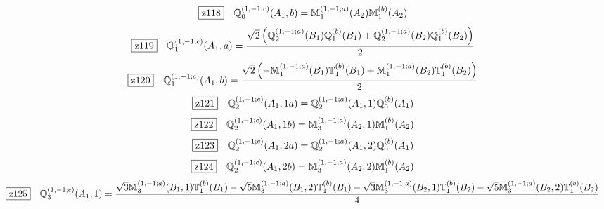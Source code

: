 \documentclass[fleqn,10pt,landscape]{jsarticle}
\begin{document}
\begin{dmath*}
\hspace*{3mm}\fbox{z118}\quad \mathbb{Q}_{0}^{(1,-1;c)}(A_{1},b)=\mathbb{M}_{1}^{(1,-1;a)}(A_{2}) \mathbb{M}_{1}^{(b)}(A_{2})
\end{dmath*}
\begin{dmath*}
\hspace*{3mm}\fbox{z119}\quad \mathbb{Q}_{1}^{(1,-1;c)}(A_{1},a)=\frac{\sqrt{2} \left(\mathbb{Q}_{2}^{(1,-1;a)}(B_{1}) \mathbb{Q}_{1}^{(b)}(B_{1}) + \mathbb{Q}_{2}^{(1,-1;a)}(B_{2}) \mathbb{Q}_{1}^{(b)}(B_{2})\right)}{2}
\end{dmath*}
\begin{dmath*}
\hspace*{3mm}\fbox{z120}\quad \mathbb{Q}_{1}^{(1,-1;c)}(A_{1},b)=\frac{\sqrt{2} \left(- \mathbb{M}_{1}^{(1,-1;a)}(B_{1}) \mathbb{T}_{1}^{(b)}(B_{1}) + \mathbb{M}_{1}^{(1,-1;a)}(B_{2}) \mathbb{T}_{1}^{(b)}(B_{2})\right)}{2}
\end{dmath*}
\begin{dmath*}
\hspace*{3mm}\fbox{z121}\quad \mathbb{Q}_{2}^{(1,-1;c)}(A_{1},1a)=\mathbb{Q}_{2}^{(1,-1;a)}(A_{1},1) \mathbb{Q}_{0}^{(b)}(A_{1})
\end{dmath*}
\begin{dmath*}
\hspace*{3mm}\fbox{z122}\quad \mathbb{Q}_{2}^{(1,-1;c)}(A_{1},1b)=\mathbb{M}_{3}^{(1,-1;a)}(A_{2},1) \mathbb{M}_{1}^{(b)}(A_{2})
\end{dmath*}
\begin{dmath*}
\hspace*{3mm}\fbox{z123}\quad \mathbb{Q}_{2}^{(1,-1;c)}(A_{1},2a)=\mathbb{Q}_{2}^{(1,-1;a)}(A_{1},2) \mathbb{Q}_{0}^{(b)}(A_{1})
\end{dmath*}
\begin{dmath*}
\hspace*{3mm}\fbox{z124}\quad \mathbb{Q}_{2}^{(1,-1;c)}(A_{1},2b)=\mathbb{M}_{3}^{(1,-1;a)}(A_{2},2) \mathbb{M}_{1}^{(b)}(A_{2})
\end{dmath*}
\begin{dmath*}
\hspace*{3mm}\fbox{z125}\quad \mathbb{Q}_{3}^{(1,-1;c)}(A_{1},1)=\frac{\sqrt{3} \mathbb{M}_{3}^{(1,-1;a)}(B_{1},1) \mathbb{T}_{1}^{(b)}(B_{1}) - \sqrt{5} \mathbb{M}_{3}^{(1,-1;a)}(B_{1},2) \mathbb{T}_{1}^{(b)}(B_{1}) - \sqrt{3} \mathbb{M}_{3}^{(1,-1;a)}(B_{2},1) \mathbb{T}_{1}^{(b)}(B_{2}) - \sqrt{5} \mathbb{M}_{3}^{(1,-1;a)}(B_{2},2) \mathbb{T}_{1}^{(b)}(B_{2})}{4}
\end{dmath*}
\end{document}
